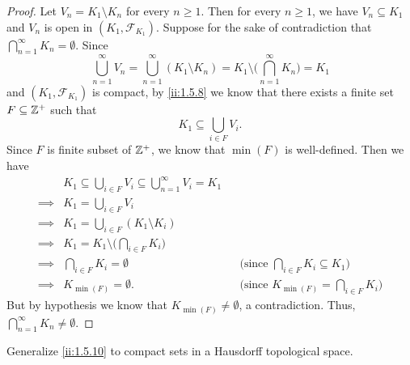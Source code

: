 \begin{proof}
  Let \(V_n = K_1 \setminus K_n\) for every \(n \geq 1\).
  Then for every \(n \geq 1\), we have \(V_n \subseteq K_1\) and \(V_n\) is open in \((K_1, \mathcal{F}_{K_1})\).
  Suppose for the sake of contradiction that \(\bigcap_{n = 1}^\infty K_n = \emptyset\).
  Since
  \[
    \bigcup_{n = 1}^\infty V_n = \bigcup_{n = 1}^\infty (K_1 \setminus K_n) = K_1 \setminus \bigg(\bigcap_{n = 1}^\infty K_n\bigg) = K_1
  \]
  and \((K_1, \mathcal{F}_{K_1})\) is compact, by \cref{ii:1.5.8} we know that there exists a finite set \(F \subseteq \mathbb{Z}^+\) such that
  \[
    K_1 \subseteq \bigcup_{i \in F} V_i.
  \]
  Since \(F\) is finite subset of \(\mathbb{Z}^+\), we know that \(\min(F)\) is well-defined.
  Then we have
  \begin{align*}
             & K_1 \subseteq \bigcup_{i \in F} V_i \subseteq \bigcup_{n = 1}^\infty V_i = K_1                                                             \\
    \implies & K_1 = \bigcup_{i \in F} V_i                                                                                                                \\
    \implies & K_1 = \bigcup_{i \in F} (K_1 \setminus K_i)                                                                                                \\
    \implies & K_1 = K_1 \setminus \bigg(\bigcap_{i \in F} K_i\bigg)                                                                                      \\
    \implies & \bigcap_{i \in F} K_i = \emptyset                                              &  & \text{(since \(\bigcap_{i \in F} K_i \subseteq K_1)\)} \\
    \implies & K_{\min(F)} = \emptyset.                                                       &  & \text{(since \(K_{\min(F)} = \bigcap_{i \in F} K_i)\)}
  \end{align*}
  But by hypothesis we know that \(K_{\min(F)} \neq \emptyset\), a contradiction.
  Thus, \(\bigcap_{n = 1}^\infty K_n \neq \emptyset\).
\end{proof}

\begin{ex}\label{ii:ex:2.5.14}
  Generalize \cref{ii:1.5.10} to compact sets in a Hausdorff topological space.
\end{ex}

